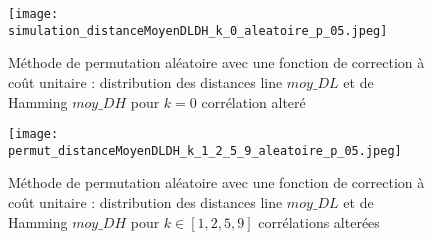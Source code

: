 

\begin{figure}[htb!] 
\centering
\texttt{[image: simulation\_distanceMoyenDLDH\_k\_0\_aleatoire\_p\_05.jpeg]}
\caption{ M\'ethode de permutation al\'eatoire avec une fonction de correction \`a co\^ut unitaire : distribution des distances line $moy\_DL$ et de Hamming $moy\_DH$ pour $k =0 $ corr\'elation alter\'e}
\label{permut_distanceMoyenDLDH_k_0_aleatoire_p_05} 
\end{figure}

\begin{figure}[htb!] 
\centering
\texttt{[image: permut\_distanceMoyenDLDH\_k\_1\_2\_5\_9\_aleatoire\_p\_05.jpeg]}
\caption{ M\'ethode de permutation al\'eatoire avec une fonction de correction \`a co\^ut unitaire : distribution des distances line $moy\_DL$ et de Hamming $moy\_DH$ pour $k \in [1,2,5, 9]$ corr\'elations alter\'ees}
\label{permut_distanceMoyenDLDH_k_1_2_5_9_aleatoire_p_05} 
\end{figure}


